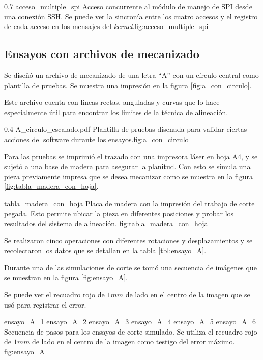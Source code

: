\subfiga
{0.7} {acceso_multiple_spi} {Acceso concurrente al módulo de manejo de SPI desde una conexión SSH. Se puede ver la sincronía entre los cuatro accesos y el registro de cada acceso en los mensajes del \textit{kernel}.}{fig:acceso_multiple_spi}


\subsection{Ensayos con archivos de mecanizado}

Se diseñó un archivo de mecanizado de una letra ``A'' con un círculo central como plantilla de pruebas. Se muestra una impresión en la figura \ref{fig:a_con_circulo}.\par

Este archivo cuenta con líneas rectas, anguladas y curvas que lo hace especialmente útil para encontrar los limites de la técnica de alineación. \par
\subfiga
{0.4} {A_circulo_escalado.pdf} {Plantilla de pruebas disenada para validar ciertas acciones del software durante los ensayos.}{fig:a_con_circulo}

Para las pruebas se imprimió el trazado con una impresora láser en hoja A4, y se sujetó a una base de madera para asegurar la planitud. Con esto se simula una pieza previamente impresa que se desea mecanizar como se muestra en la figura \ref{fig:tabla_madera_con_hoja}.\par

    {tabla_madera_con_hoja} {Placa de madera con la impresión del trabajo de corte pegada. Esto permite ubicar la pieza en diferentes posiciones y probar los resultados del sistema de alineación.} {fig:tabla_madera_con_hoja}

   Se realizaron cinco operaciones con diferentes rotaciones y desplazamientos y se recolectaron los datos que se detallan en la tabla \ref{tbl:ensayo_A}.\par
   Durante una de las simulaciones de corte se tomó una secuencia de imágenes que se muestran en la figura \ref{fig:ensayo_A}.\par
   Se puede ver el recuadro rojo de $1mm$ de lado en el centro de la imagen que se usó para registrar el error.\par

   \subfigthreethree
      {ensayo_A_1}
      {ensayo_A_2}
      {ensayo_A_3}
      {ensayo_A_4}
      {ensayo_A_5}
      {ensayo_A_6}
      {Secuencia de pasos para los ensayos de corte simulado. Se utiliza el recuadro rojo de $1mm$ de lado en el centro de la imagen como testigo del error máximo.}
      {fig:ensayo_A}

